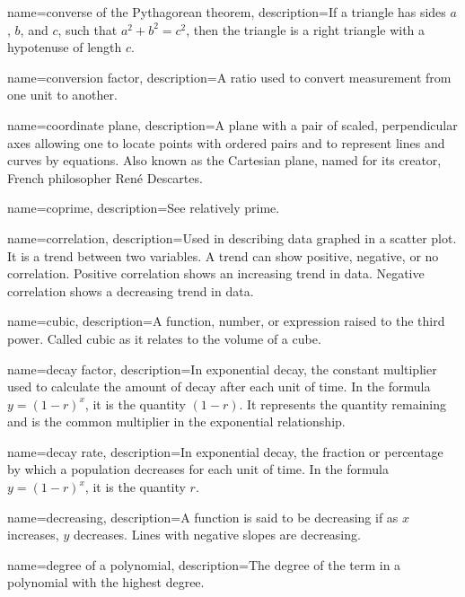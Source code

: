  {
	name=converse of the Pythagorean theorem,
	description={If a triangle has sides $a$, $b$, and $c$, such that $a^2+b^2=c^2$, then the triangle is a right triangle with a hypotenuse of length $c$.}
}

 {
	name=conversion factor,
	description={A ratio used to convert measurement from one unit to another.}
}

 {
	name=coordinate plane,
	description={A plane with a pair of scaled, perpendicular axes allowing one to locate points with ordered pairs and to represent lines and curves by equations. Also known as the Cartesian plane, named for its creator, French philosopher Ren\'{e} Descartes.}
}

 {
	name=coprime,
	description={See \gls{relatively prime}.}
}

 {
	name=correlation,
	description={Used in describing data graphed in a scatter plot. It is a trend between two variables. A trend can show positive, negative, or no correlation. Positive correlation shows an \gls{increasing} trend in data. Negative correlation 
shows a \gls{decreasing} trend in data.}
}

 {
	name=cubic,
	description={A function, number, or expression raised to the third power. Called cubic as it relates to the volume of a cube.}
}

 {
	name=decay factor,
	description={In exponential decay, the constant multiplier used to calculate the amount of decay after each unit of time. In the formula $y = (1-r)^x$, it is the quantity $(1-r)$. It represents the quantity remaining and is the common multiplier in the exponential relationship.}
}

 {
	name=decay rate,
	description={In exponential decay, the fraction or percentage by which a population decreases for each unit of time. In the formula $y = (1-r)^x$, it is the quantity $r$.}
}

 {
	name=decreasing,
	description={A function is said to be decreasing if as $x$ increases, $y$ decreases. Lines with negative slopes are decreasing.}
}

 {
	name=degree of a polynomial,
	description={The degree of the term in a polynomial with the highest degree.}
}

